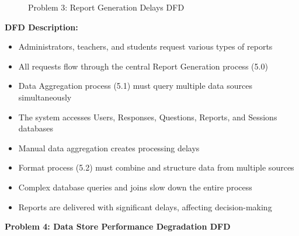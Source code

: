 \documentclass[12pt,a4paper,oneside]{book}
\begin{document}
\begin{figure}[H]
{
    }
    \caption{Problem 3: Report Generation Delays DFD}
\end{figure}

\textbf{DFD Description:} 
\begin{itemize}
    \item Administrators, teachers, and students request various types of reports
    \item All requests flow through the central Report Generation process (5.0)
    \item Data Aggregation process (5.1) must query multiple data sources simultaneously
    \item The system accesses Users, Responses, Questions, Reports, and Sessions databases
    \item Manual data aggregation creates processing delays
    \item Format process (5.2) must combine and structure data from multiple sources
    \item Complex database queries and joins slow down the entire process
    \item Reports are delivered with significant delays, affecting decision-making
\end{itemize}

\vspace{0.5cm}
\newpage
\textbf{Problem 4: Data Store Performance Degradation DFD}
\end{document}
